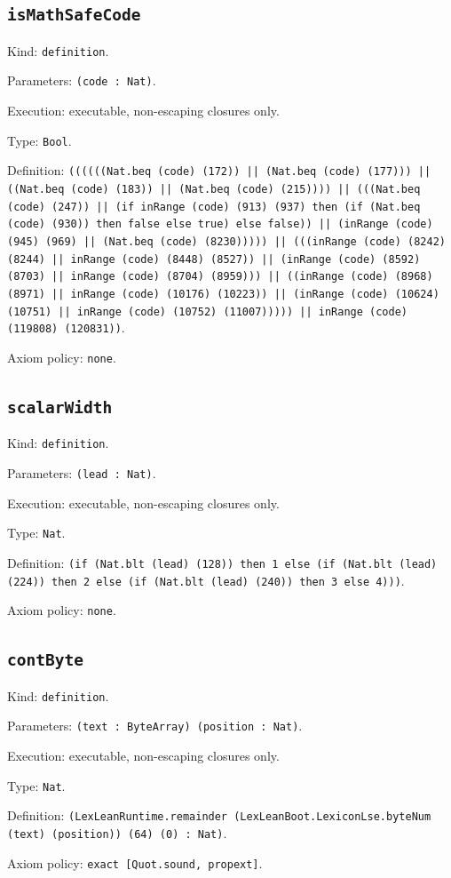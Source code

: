 \documentclass[11pt]{article}
\begin{document}
\subsection*{\texttt{isMathSafeCode}}
\noindent Kind: \texttt{definition}.\par
\noindent Parameters: \texttt{(code : Nat)}.\par
\noindent Execution: executable, non-escaping closures only.\par
\noindent Type: \texttt{Bool}.\par
\noindent Definition: \texttt{((((((Nat.beq (code) (172)) || (Nat.beq (code) (177))) || ((Nat.beq (code) (183)) || (Nat.beq (code) (215)))) || (((Nat.beq (code) (247)) || (if inRange (code) (913) (937) then (if (Nat.beq (code) (930)) then false else true) else false)) || (inRange (code) (945) (969) || (Nat.beq (code) (8230))))) || (((inRange (code) (8242) (8244) || inRange (code) (8448) (8527)) || (inRange (code) (8592) (8703) || inRange (code) (8704) (8959))) || ((inRange (code) (8968) (8971) || inRange (code) (10176) (10223)) || (inRange (code) (10624) (10751) || inRange (code) (10752) (11007))))) || inRange (code) (119808) (120831))}.\par
\noindent Axiom policy: \texttt{none}.\par
\subsection*{\texttt{scalarWidth}}
\noindent Kind: \texttt{definition}.\par
\noindent Parameters: \texttt{(lead : Nat)}.\par
\noindent Execution: executable, non-escaping closures only.\par
\noindent Type: \texttt{Nat}.\par
\noindent Definition: \texttt{(if (Nat.blt (lead) (128)) then 1 else (if (Nat.blt (lead) (224)) then 2 else (if (Nat.blt (lead) (240)) then 3 else 4)))}.\par
\noindent Axiom policy: \texttt{none}.\par
\subsection*{\texttt{contByte}}
\noindent Kind: \texttt{definition}.\par
\noindent Parameters: \texttt{(text : ByteArray) (position : Nat)}.\par
\noindent Execution: executable, non-escaping closures only.\par
\noindent Type: \texttt{Nat}.\par
\noindent Definition: \texttt{(LexLeanRuntime.remainder (LexLeanBoot.LexiconLse.byteNum (text) (position)) (64) (0) : Nat)}.\par
\noindent Axiom policy: \texttt{exact [Quot.sound, propext]}.\par
\end{document}
